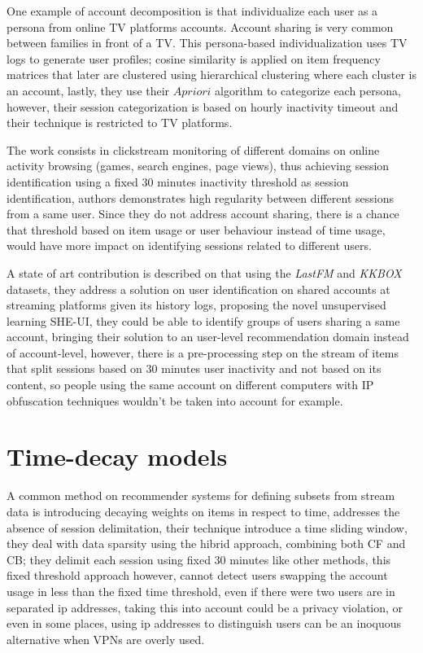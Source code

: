 \documentclass[ecp,tc,english]{iiufrgs}
\begin{document}
One example of account decomposition is \cite{bajaj2016} that individualize each user as a  persona from online TV platforms accounts. Account sharing is very common between families  in front of a TV. This persona-based individualization uses TV logs to generate user profiles; cosine similarity is applied on item frequency matrices that later are clustered using hierarchical clustering where each cluster is an account, lastly, they use their \(Apriori\) algorithm to categorize each persona, however, their session categorization is based on hourly inactivity timeout and their technique is restricted to TV platforms.

The work \cite{halfaker2015} consists in clickstream monitoring of different domains on online activity browsing (games, search engines, page views), thus achieving session identification using a fixed 30 minutes inactivity threshold as session identification, authors demonstrates high regularity between different sessions from a same user. 
Since they do not address account sharing, there is a chance that threshold based on item usage or user behaviour instead of time usage, would have more impact on identifying sessions related to different users.

A state of art contribution is described on \cite{jiang2018} that using the \textit{LastFM} and \textit{KKBOX} datasets, they address a solution on user identification on shared accounts at streaming platforms given its history logs, proposing the novel unsupervised learning SHE-UI, they could be able to identify groups of users sharing a same account, bringing their solution to an user-level recommendation domain instead of account-level, however, there is a pre-processing step on the stream of items that split sessions based on 30 minutes user inactivity and not based on its content, so people using the same account on different computers with IP obfuscation techniques wouldn't be taken into account for example.


\section{Time-decay models}

A common method on recommender systems for defining subsets from stream data is introducing decaying weights on items in respect to time, \cite{sottocornola2018} addresses the absence of session delimitation, their technique introduce a time sliding window, they deal with data sparsity using the hibrid approach, combining both CF and CB; they delimit each session using fixed 30 minutes like other methods, this fixed threshold approach however, cannot detect users swapping the account usage in less than the fixed time threshold, even if there were two users are in separated ip addresses, taking this into account could be a privacy violation, or even in some places, using ip addresses to distinguish users can be an inoquous alternative when VPNs are overly used.
\end{document}
